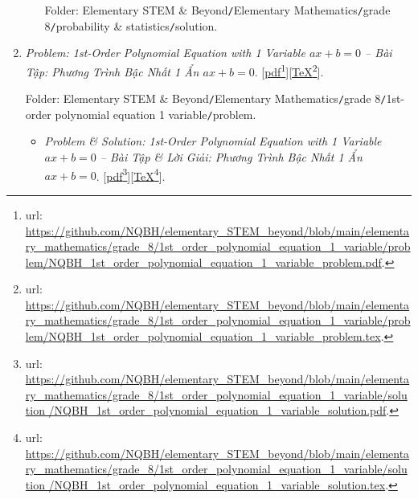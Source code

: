 \documentclass[12pt,twoside]{book}
\begin{document}
\begin{enumerate}
\begin{itemize}
		Folder: {\sf Elementary STEM \& Beyond{\tt/}Elementary Mathematics{\tt/}grade 8{\tt/}probability \& statistics{\tt/}solution}.
	\end{itemize}
	\item {\it Problem: 1st-Order Polynomial Equation with 1 Variable $ax + b = 0$ -- Bài Tập: Phương Trình Bậc Nhất 1 Ẩn $ax + b = 0$}. [\href{https://github.com/NQBH/elementary_STEM_beyond/blob/main/elementary_mathematics/grade_8/1st_order_polynomial_equation_1_variable/problem/NQBH_1st_order_polynomial_equation_1_variable_problem.pdf}{pdf}\footnote{{\sc url}: \url{https://github.com/NQBH/elementary_STEM_beyond/blob/main/elementary_mathematics/grade_8/1st_order_polynomial_equation_1_variable/problem/NQBH_1st_order_polynomial_equation_1_variable_problem.pdf}.}][\href{https://github.com/NQBH/elementary_STEM_beyond/blob/main/elementary_mathematics/grade_8/1st_order_polynomial_equation_1_variable/problem/NQBH_1st_order_polynomial_equation_1_variable_problem.tex}{\TeX}\footnote{{\sc url}: \url{https://github.com/NQBH/elementary_STEM_beyond/blob/main/elementary_mathematics/grade_8/1st_order_polynomial_equation_1_variable/problem/NQBH_1st_order_polynomial_equation_1_variable_problem.tex}.}].
	
	Folder: {\sf Elementary STEM \& Beyond{\tt/}Elementary Mathematics{\tt/}grade 8{\tt/}1st-order polynomial equation 1 variable{\tt/}problem}.
	\begin{itemize}
		\item {\it Problem \& Solution: 1st-Order Polynomial Equation with 1 Variable $ax + b = 0$ -- Bài Tập \& Lời Giải: Phương Trình Bậc Nhất 1 Ẩn $ax + b = 0$}. [\href{https://github.com/NQBH/elementary_STEM_beyond/blob/main/elementary_mathematics/grade_8/1st_order_polynomial_equation_1_variable/solution /NQBH_1st_order_polynomial_equation_1_variable_solution.pdf}{pdf}\footnote{{\sc url}: \url{https://github.com/NQBH/elementary_STEM_beyond/blob/main/elementary_mathematics/grade_8/1st_order_polynomial_equation_1_variable/solution /NQBH_1st_order_polynomial_equation_1_variable_solution.pdf}.}][\href{https://github.com/NQBH/elementary_STEM_beyond/blob/main/elementary_mathematics/grade_8/1st_order_polynomial_equation_1_variable/solution /NQBH_1st_order_polynomial_equation_1_variable_solution.tex}{\TeX}\footnote{{\sc url}: \url{https://github.com/NQBH/elementary_STEM_beyond/blob/main/elementary_mathematics/grade_8/1st_order_polynomial_equation_1_variable/solution /NQBH_1st_order_polynomial_equation_1_variable_solution.tex}.}].
		

\end{itemize}
\end{enumerate}
\end{document}

